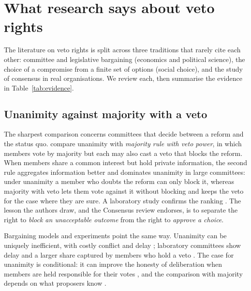 \section{What research says about veto rights}\label{sec:veto}

The literature on veto rights is split across three traditions that rarely cite each other: committee
and legislative bargaining (economics and political science), the choice of a compromise from a finite
set of options (social choice), and the study of consensus in real organisations. We review each, then
summarise the evidence in Table~\ref{tab:evidence}.

\subsection{Unanimity against majority with a veto}

The sharpest comparison concerns committees that decide between a reform and the status quo.
\citet{BoutonLlorenteSaguerMalherbe2018} compare unanimity with \emph{majority rule with veto power}, in
which members vote by majority but each may also cast a veto that blocks the reform. When members share a common interest but hold private information, the second rule
aggregates information better and dominates unanimity in large committees: under unanimity a member
who doubts the reform can only block it, whereas majority with veto lets them vote against it without
blocking and keeps the veto for the case where they are sure. A laboratory study confirms the ranking
\citep{BoutonLlorenteSaguerMalherbe2017}. The lesson the authors draw, and the Consensus review
endorses, is to separate the right to \emph{block an unacceptable outcome} from the right to
\emph{approve a choice}.

Bargaining models and experiments point the same way. Unanimity can be uniquely inefficient, with
costly conflict and delay \citep{MiettinenVanberg2025,PiazoloVanberg2025}; laboratory committees show
delay and a larger share captured by members who hold a veto
\citep{LaingSlotznick1991,KagelSungWinter2010,AgranovTergiman2019}. The case for unanimity is
conditional: it can improve the honesty of deliberation when members are held responsible for their
votes \citep{BreitmoserValasek2024}, and the comparison with majority depends on what proposers know
\citep{GlyniaThumXefteris2026}.


